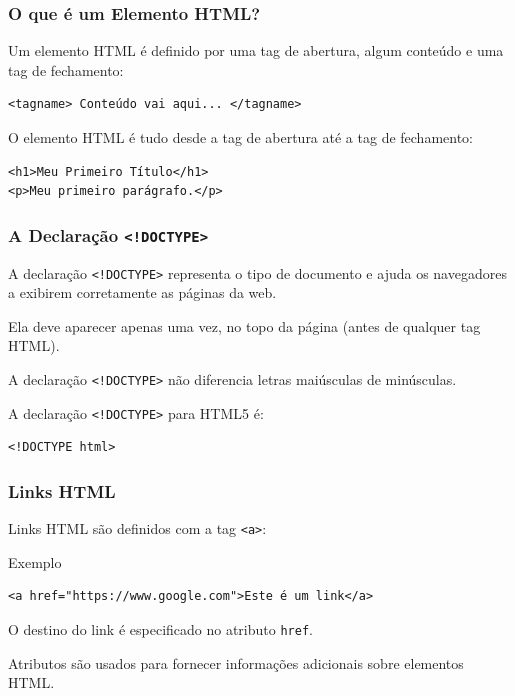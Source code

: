 \documentclass{beamer}
\begin{document}
\begin{frame}[fragile]
\frametitle{O que é um Elemento HTML?}

Um elemento HTML é definido por uma tag de abertura, algum conteúdo e uma tag de fechamento:
\begin{verbatim}
<tagname> Conteúdo vai aqui... </tagname>
\end{verbatim}

O elemento HTML é tudo desde a tag de abertura até a tag de fechamento:
\begin{verbatim}
<h1>Meu Primeiro Título</h1>
<p>Meu primeiro parágrafo.</p>
\end{verbatim}

\end{frame}


\begin{frame}[fragile]
\frametitle{A Declaração \texttt{<!DOCTYPE>}}
A declaração \texttt{<!DOCTYPE>} representa o tipo de documento e ajuda os navegadores a exibirem corretamente as páginas da web.

Ela deve aparecer apenas uma vez, no topo da página (antes de qualquer tag HTML).

A declaração \texttt{<!DOCTYPE>} não diferencia letras maiúsculas de minúsculas.

A declaração \texttt{<!DOCTYPE>} para HTML5 é:
\begin{verbatim}
<!DOCTYPE html>
\end{verbatim}
\end{frame}



\begin{frame}[fragile]
\frametitle{Links HTML}

Links HTML são definidos com a tag \texttt{<a>}:\\

\begin{block}{Exemplo}
\begin{verbatim}
<a href="https://www.google.com">Este é um link</a>
\end{verbatim}
\end{block}


O destino do link é especificado no atributo \texttt{href}.

Atributos são usados para fornecer informações adicionais sobre elementos HTML.
\end{frame}
\end{document}
